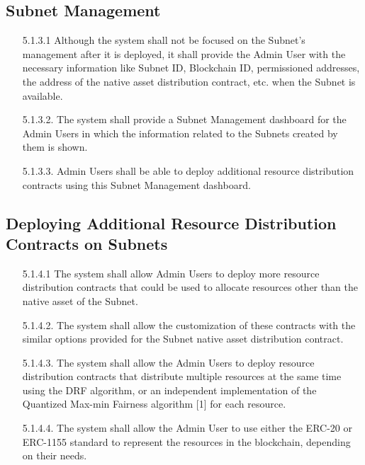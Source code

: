 \documentclass[a4paper,12pt]{report}
\begin{document}
\subsection{Subnet Management}
\begin{itemize}
	\item [5.1.3.1]
	Although the system shall not be focused on the Subnet’s management after it is deployed, it shall provide the Admin User with the necessary information like Subnet ID, Blockchain ID, permissioned addresses, the address of the native asset distribution contract, etc. when the Subnet is available.
	\\
	\item [5.1.3.2.]
	The system shall provide a Subnet Management dashboard for the Admin Users in which the information related to the Subnets created by them is shown.
	\\
	\item [5.1.3.3.]
	Admin Users shall be able to deploy additional resource distribution contracts using this Subnet Management dashboard.
\end{itemize}

\subsection{Deploying Additional Resource Distribution Contracts on Subnets}
\begin{itemize}
	\item [5.1.4.1]
	The system shall allow Admin Users to deploy more resource distribution contracts that could be used to allocate resources other than the native asset of the Subnet.
	\\
	\item [5.1.4.2.]
	The system shall allow the customization of these contracts with the similar options provided for the Subnet native asset distribution contract.
	\\
	\item [5.1.4.3.]
	The system shall allow the Admin Users to deploy resource distribution contracts that distribute multiple resources at the same time using the DRF algorithm, or an independent implementation of the Quantized Max-min Fairness algorithm [1] for each resource.
	\\
	\item [5.1.4.4.]
	The system shall allow the Admin User to use either the ERC-20 or ERC-1155 standard to represent the resources in the blockchain, depending on their needs.
\end{itemize}
\end{document}
